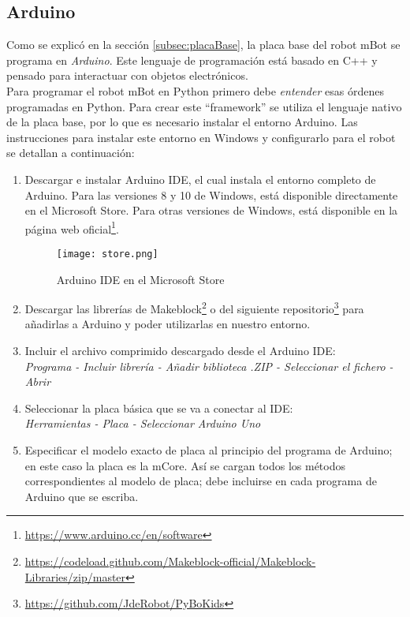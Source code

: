 \subsection{Arduino}\label{subsec:arduino}
Como se explicó en la sección \ref{subsec:placaBase}, la placa base del robot mBot se programa en \textit{Arduino}\cite{arduinolenguaje}. Este lenguaje de programación está basado en C++ y pensado para interactuar con objetos electrónicos. \\
Para programar el robot mBot en Python primero debe \textit{entender} esas órdenes programadas en Python. Para crear este ``framework'' se utiliza el lenguaje nativo de la placa base, por lo que es necesario instalar el entorno Arduino. Las instrucciones para instalar este entorno en Windows y configurarlo para el robot se detallan a continuación:
\begin{enumerate}\label{list:InstalacionArduino}
	\item Descargar e instalar Arduino IDE, el cual instala el entorno completo de Arduino. Para las versiones 8 y 10 de Windows, está disponible directamente en el Microsoft Store. Para otras versiones de Windows, está disponible en la página web oficial\footnote{\href{https://www.arduino.cc/en/software}{https://www.arduino.cc/en/software}}.
	\begin{figure}[h]
		\texttt{[image: store.png]}
		\centering
		\caption{Arduino IDE en el Microsoft Store}
		\label{img:MStore}
	\end{figure}
	\item Descargar las librerías de Makeblock\footnote{\href{https://codeload.github.com/Makeblock-official/Makeblock-Libraries/zip/master}{https://codeload.github.com/Makeblock-official/Makeblock-Libraries/zip/master}} o del siguiente repositorio\footnote{\href{https://github.com/JdeRobot/PyBoKids}{https://github.com/JdeRobot/PyBoKids}} para añadirlas a Arduino y poder utilizarlas en nuestro entorno.
	\item Incluir el archivo comprimido descargado desde el Arduino IDE:\\ \textit{Programa - Incluir librería - Añadir biblioteca .ZIP - Seleccionar el fichero - Abrir}
	\item Seleccionar la placa básica que se va a conectar al IDE:\\
	\textit{Herramientas - Placa - Seleccionar Arduino Uno}
	\item Especificar el modelo exacto de placa al principio del programa de Arduino; en este caso la placa es la mCore. Así se cargan todos los métodos correspondientes al modelo de placa; debe incluirse en cada programa de Arduino que se escriba.

\end{enumerate}
